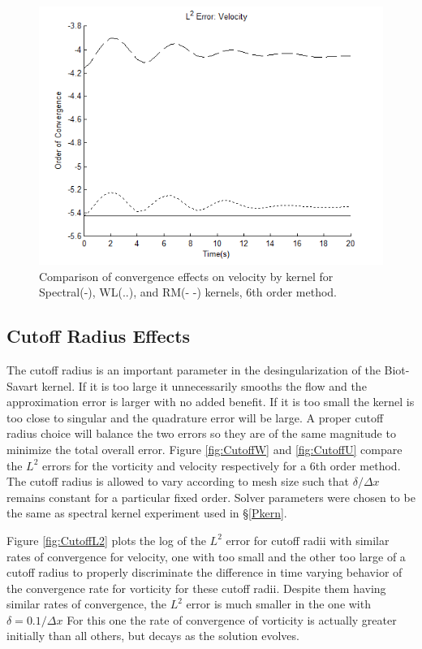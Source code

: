 \documentclass[letterpaper,12pt]{report}
\begin{document}
\begin{figure}
\centering
\includegraphics[width=1\textwidth]{KernU.PNG}
\caption{\label{fig:KernU}Comparison of convergence effects on velocity by kernel for Spectral(-), WL(..), and RM(- -) kernels, 6th order method.}
\end{figure}

%
\subsection{Cutoff Radius Effects}\label{Pcutoff}
The cutoff radius is an important parameter in the desingularization of the Biot-Savart kernel. If it is too large it unnecessarily smooths the flow and the approximation error is larger with no added benefit. If it is too small the kernel is too close to singular and the quadrature error will be large. A proper cutoff radius choice will balance the two errors so they are of the same magnitude to minimize the total overall error. Figure \ref{fig:CutoffW} and \ref{fig:CutoffU} compare the $L^2$ errors for the vorticity and velocity respectively for a 6th order method. The cutoff radius is allowed to vary according to mesh size such that $\delta/\Delta x$ remains constant for a particular fixed order. Solver parameters were chosen to be the same as spectral kernel experiment used in \S \ref{Pkern}.

Figure \ref{fig:CutoffL2} plots the log of the $L^2$ error for cutoff radii with similar rates of convergence for velocity, one with too small and the other too large of a cutoff radius to properly discriminate the difference in time varying behavior of the convergence rate for vorticity for these cutoff radii. Despite them having similar rates of convergence, the $L^2$ error is much smaller in the one with $\delta=0.1/\Delta x$ For this one the rate of convergence of vorticity is actually greater initially than all others, but decays as the solution evolves.
\end{document}
